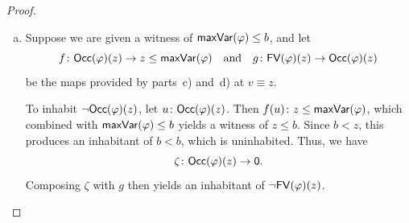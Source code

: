 \begin{proof}
\begin{enumerate}[a),font=\upshape]
\begin{itemize}
            \item For $\varphi\equiv\forall y\,\psi$, the induction hypothesis gives a map
            \[
                h\colon\fun{FV}(\psi)(v)
                    \to\fun{Occ}(\psi)(v).
            \]
            Since
            \[
            \fun{FV}(\forall y\,\psi)(v)
                \equiv
                    \fun{FV}(\psi)(v)
                    \times
                    \neg(v\eq{\fun{Var}}y)
            \]
            and
            \[
                \fun{Occ}(\forall y\,\psi)(v)
                    \equiv\lVert
                        (y\eq{\fun{Var}}v)+\fun{Occ}(\psi)(v)
                    \rVert,
            \]
            the required map is given by
            \[
                \lambda x.\,\lvert
                    \fun{inr}(h(\pi_1(x)))
                \rvert
                \colon\fun{FV}(\forall y\,\psi)(v)
                    \to\fun{Occ}(\forall y\,\psi)(v).
            \]
        \end{itemize}

        \item Suppose we are given a witness of $\mathsf{maxVar}(\varphi)\le b$, and let
        \[
        f\colon\fun{Occ}(\varphi)(z)\to z\le\fun{maxVar}(\varphi)
        \quad\text{and}\quad
        g\colon\fun{FV}(\varphi)(z)\to\fun{Occ}(\varphi)(z)
        \]
        be the maps provided by parts~c) and~d) at $v\equiv z$.
        
        To inhabit $\neg\mathsf{Occ}(\varphi)(z)$, let $u\colon\fun{Occ}(\varphi)(z)$. Then $f(u)\colon z\le\fun{maxVar}(\varphi)$, which combined with $\mathsf{maxVar}(\varphi)\le b$ yields a witness of $z\le b$. Since $b<z$, this produces an inhabitant of $b<b$, which is uninhabited. Thus, we have
        \[
            \zeta\colon\fun{Occ}(\varphi)(z)\to\fun0.
        \]
        Composing $\zeta$ with $g$ then yields an inhabitant of $\neg\mathsf{FV}(\varphi)(z)$.
    \end{enumerate}
\end{proof}

